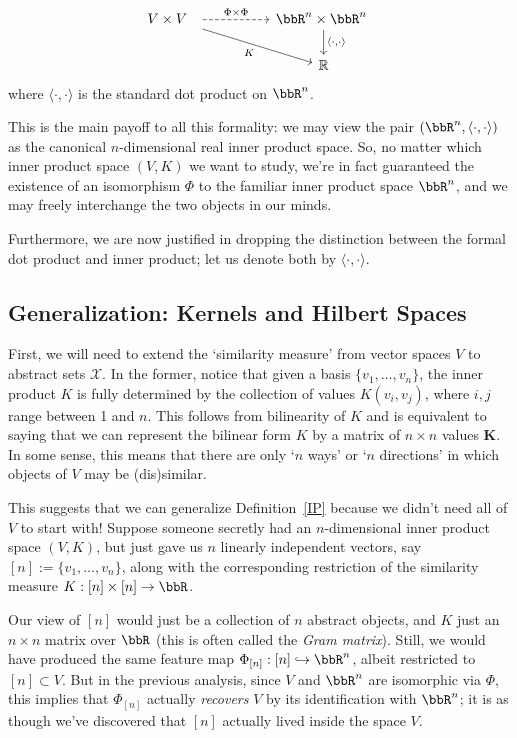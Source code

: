 \documentclass[twoside,11pt]{homework}
\begin{document}
\begin{multicols}{2}
\begin{proposition}
  \[\begin{tikzcd}
V \times V\ \  \arrow[dashed, rr, "\Phi \times \Phi"] \arrow[drr, "K"'] & & \bbR^n \times \bbR^n \ \arrow[d, "{\langle\cdot,\cdot \rangle}"] \\
& & \mathbb{R}
\end{tikzcd}
\]
  where $\langle \cdot, \cdot \rangle$ is the standard dot product on $\bbR^n$.
\end{proposition}
This is the main payoff to all this formality: we may view the pair $(\bbR^n, \langle\cdot,\cdot\rangle)$ as the canonical $n$-dimensional real inner product space. So, no matter which inner product space $(V,K)$ we want to study, we're in fact guaranteed the existence of an isomorphism $\Phi$ to the familiar inner product space $\bbR^n$, and we may freely interchange the two objects in our minds.

Furthermore, we are now justified in dropping the distinction between the formal dot product and inner product; let us denote both by $\langle \cdot, \cdot\rangle$.

\subsection{Generalization: Kernels and Hilbert Spaces}
First, we will need to extend the `similarity measure' from vector spaces $V$ to abstract sets $\mathcal{X}$. In the former, notice that given a basis $\{v_1,\dotsc, v_n\}$, the inner product $K$ is fully determined by the collection of values $K(v_i,v_j)$, where $i,j$ range between 1 and $n$. This follows from bilinearity of $K$ and is equivalent to saying that we can represent the bilinear form $K$ by a matrix of $n\times n$ values $\mathbf{K}$. In some sense, this means that there are only `$n$ ways' or `$n$ directions' in which objects of $V$ may be (dis)similar.

This suggests that we can generalize Definition~\ref{IP} because we didn't need all of $V$ to start with! Suppose someone secretly had an $n$-dimensional inner product space $(V,K)$, but just gave us $n$ linearly independent vectors, say $[n] := \{v_1,\dotsc, v_n\}$, along with the corresponding restriction of the similarity measure $K: [n] \times [n] \to \bbR$.

Our view of $[n]$ would just be a collection of $n$ abstract objects, and $K$ just an $n\times n$ matrix over $\bbR$ (this is often called the \emph{Gram matrix}). Still, we would have produced the same feature map $\Phi_{[n]}: [n] \hookrightarrow \bbR^n$, albeit restricted to $[n]\subset V$. But in the previous analysis, since $V$ and $\bbR^n$ are isomorphic via $\Phi$, this implies that $\Phi_{[n]}$ actually \emph{recovers} $V$ by its identification with $\bbR^n$; it is as though we've discovered that $[n]$ actually lived inside the space $V$.


\end{multicols}
\end{document}
